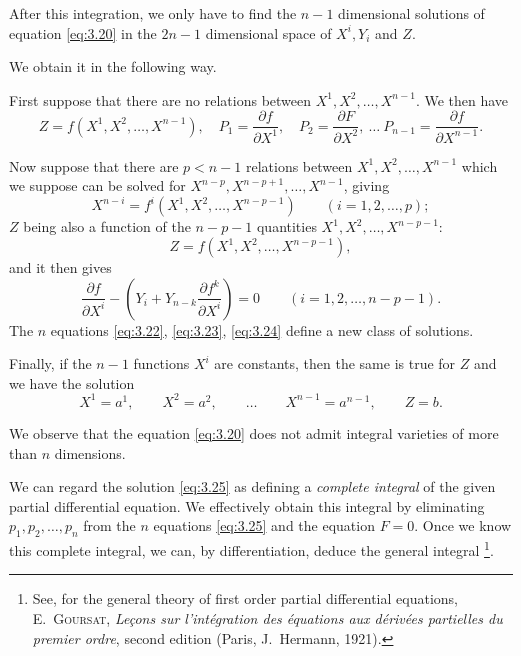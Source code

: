 \documentclass[leqno,11pt]{book}
\numberwithin{equation}{chapter}
\newcommand{\pd}{\partial}
\theoremstyle{shape1}
\theoremstyle{shape0}
\theoremstyle{shape2}
\theoremstyle{definition}
\begin{document}
After this integration, we only have to find the $n-1$ dimensional solutions of equation \eqref{eq:3.20} in the $2n-1$ dimensional space of $X^{i},Y_{i}$ and $Z$.

We obtain it in the following way.

First suppose that there are no relations between $X^{1},X^{2},\dots,X^{n-1}$. We then have
\begin{equation}
  \label{eq:3.21}
  Z=f(X^{1},X^{2},\dots,X^{n-1}),\quad P_{1}=\frac{\pd f}{\pd X^{1}},\quad P_{2}=\frac{\pd F}{\pd X^{2}},\ \dots\ P_{n-1}=\frac{\pd f}{\pd X^{n-1}}.
\end{equation}

Now suppose that there are $p<n-1$ relations between $X^{1},X^{2},\dots,X^{n-1}$ which we suppose can be solved for $X^{n-p},X^{n-p+1},\dots,X^{n-1}$, giving
\begin{equation}
  \label{eq:3.22}
  X^{n-i}=f^{i}(X^{1},X^{2},\dots,X^{n-p-1})\qquad (i=1,2,\dots,p);
\end{equation}
$Z$ being also a function of the $n-p-1$ quantities $X^{1},X^{2},\dots,X^{n-p-1}$:
\begin{equation}
  \label{eq:3.23}
  Z=f(X^{1},X^{2},\dots,X^{n-p-1}),
\end{equation}
and it then gives
\begin{equation}
  \label{eq:3.24}
  \frac{\pd f}{\pd X^{i}}-\left(Y_{i}+Y_{n-k}\frac{\pd f^{k}}{\pd X^{i}}\right)=0\qquad(i=1,2,\dots,n-p-1).
\end{equation}
The $n$ equations \eqref{eq:3.22}, \eqref{eq:3.23}, \eqref{eq:3.24} define a new class of solutions.

Finally, if the $n-1$ functions $X^{i}$ are constants, then the same is true for $Z$ and we have the solution
\begin{equation}
  \label{eq:3.25}
  X^{1}=a^{1},\qquad X^{2}=a^{2},\qquad\dots\qquad X^{n-1}=a^{n-1},\qquad Z=b.
\end{equation}

We observe that the equation \eqref{eq:3.20} does not admit integral varieties of more than $n$ dimensions.

We can regard the solution \eqref{eq:3.25} as defining a \emph{complete integral} of the given partial differential equation. We effectively obtain this integral by eliminating $p_{1},p_{2},\dots,p_{n}$ from the $n$ equations \eqref{eq:3.25} and the equation $F=0$. Once we know this complete integral, we can, by differentiation, deduce the general integral \footnote{See, for the general theory of first order partial differential equations, \textsc{E.~Goursat}, \emph{Le\c{c}ons sur l'int\'egration des \'equations aux d\'eriv\'ees partielles du premier ordre}, second edition (Paris, J.~Hermann, 1921).}.
\end{document}
